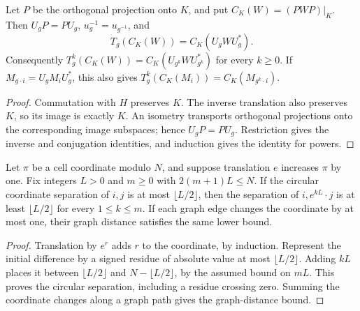 \begin{lemma}
    \label{lem:hastings_ground_translation_compression}
    \leanok
    Let $P$ be the orthogonal projection onto $K$, and put
    $C_K(W)=(PWP)|_K$. Then $U_gP=PU_g$, $u_g^{-1}=u_{g^{-1}}$, and
    \[
        T_g(C_K(W))=C_K(U_gWU_g^*).
    \]
    Consequently $T_g^k(C_K(W))=C_K(U_{g^k}WU_{g^k}^*)$ for every $k\ge0$.
    If $M_{g\cdot i}=U_gM_iU_g^*$, this also gives
    $T_g^k(C_K(M_i))=C_K(M_{g^k\cdot i})$.
\end{lemma}
\begin{proof}\leanok
    Commutation with $H$ preserves $K$. The inverse translation also
    preserves $K$, so its image is exactly $K$. An isometry transports
    orthogonal projections onto the corresponding image subspaces;
    hence $U_gP=PU_g$. Restriction gives the inverse and conjugation
    identities, and induction gives the identity for powers.
\end{proof}

\begin{lemma}
    \label{lem:hastings_finite_translation_spacing}
    \leanok
    Let $\pi$ be a cell coordinate modulo $N$, and suppose translation
    $e$ increases $\pi$ by one. Fix integers $L>0$ and $m\ge0$ with
    $2(m+1)L\le N$. If the circular coordinate separation of $i,j$ is
    at most $\lfloor L/2\rfloor$, then the separation of
    $i,e^{kL}\cdot j$ is at least $\lfloor L/2\rfloor$ for every
    $1\le k\le m$. If each graph edge changes the coordinate by at
    most one, their graph distance satisfies the same lower bound.
\end{lemma}
\begin{proof}\leanok
    Translation by $e^r$ adds $r$ to the coordinate, by induction.
    Represent the initial difference by a signed residue of absolute
    value at most $\lfloor L/2\rfloor$. Adding $kL$ places it between
    $\lfloor L/2\rfloor$ and $N-\lfloor L/2\rfloor$, by the assumed
    bound on $mL$. This proves the circular separation, including a
    residue crossing zero. Summing the coordinate changes along a
    graph path gives the graph-distance bound.
\end{proof}

